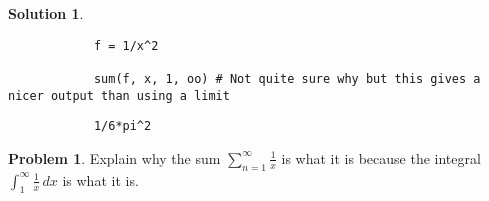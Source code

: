 \documentclass[10pt]{article}
\makeatletter
\theoremstyle{definition}
\newtheorem{problem}{Problem}
\newtheorem{soln}{Solution}
\newcommand{\boxspacing}{\kern\kvtcb@left@rule\kern\kvtcb@boxsep}
\newcommand{\prompt}[4]{
    \ttfamily\llap{{\color{#2}[#3]:\hspace{3pt}#4}}\vspace{-\baselineskip}
}
\makeatother
\begin{document}
\begin{soln}
\begin{tcolorbox}[breakable, size=fbox, boxrule=1pt, pad at break*=1mm,colback=cellbackground, colframe=cellborder]
\begin{verbatim}
            f = 1/x^2
            
            sum(f, x, 1, oo) # Not quite sure why but this gives a nicer output than using a limit
        \end{verbatim}
    \end{tcolorbox}
    \begin{tcolorbox}[breakable, size=fbox, boxrule=.5pt, pad at break*=1mm, opacityfill=0]
        \prompt{Out}{outcolor}{4}{\boxspacing}
        \begin{verbatim}
            1/6*pi^2
        \end{verbatim}
    \end{tcolorbox}

\end{soln}

\begin{problem}
Explain why the sum $\sum_{n = 1}^{\infty} \frac{1}{x}$ is what it is because the integral $\int_{1}^{\infty} \frac{1}{x} \,dx $ is what it is.
\end{problem}
\end{document}
